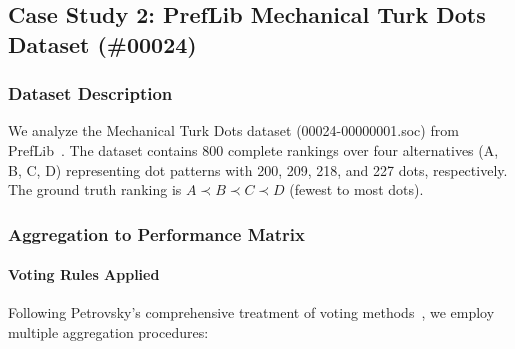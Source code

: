 \documentclass[conference]{IEEEtran}
\begin{document}
\subsection{Case Study 2: PrefLib Mechanical Turk Dots Dataset (\#00024)}

\subsubsection{Dataset Description}

We analyze the Mechanical Turk Dots dataset (00024-00000001.soc) from PrefLib~\cite{preflib2026,mao2013better}. The dataset contains 800 complete rankings over four alternatives (A, B, C, D) representing dot patterns with 200, 209, 218, and 227 dots, respectively. The ground truth ranking is $A \prec B \prec C \prec D$ (fewest to most dots).

\subsubsection{Aggregation to Performance Matrix}

\paragraph{Voting Rules Applied}

Following Petrovsky's comprehensive treatment of voting methods~\cite{petrovsky2017}, we employ multiple aggregation procedures:
\end{document}
